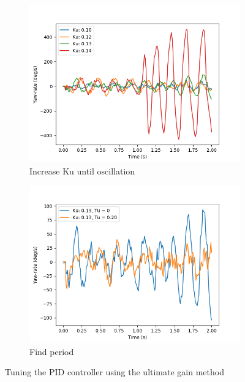 
\begin{figure}[!tbp]
	\begin{subfigure}[b]{0.5\textwidth}
		\includegraphics[width=\textwidth]{pics/straight_ku.png}
		\caption{Increase Ku until oscillation}
		\label{fig:ultimate_gain}
	\end{subfigure}
	\begin{subfigure}[b]{0.5\textwidth}
		\includegraphics[width=\textwidth]{pics/straight_ku_with_tu.png}
		\caption{Find period}
		\label{fig:gain_tuning}
	\end{subfigure}
	\caption{Tuning the PID controller using the ultimate gain method}
\end{figure}

